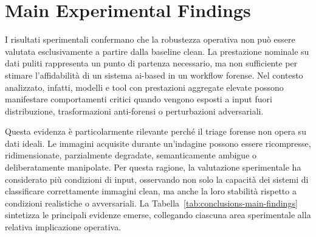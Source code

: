 \section{Main Experimental Findings}
\label{sec:conclusions-findings}

I risultati sperimentali confermano che la robustezza operativa non può essere
valutata esclusivamente a partire dalla baseline clean. La prestazione nominale
su dati puliti rappresenta un punto di partenza necessario, ma non sufficiente
per stimare l'affidabilità di un sistema \gls{ai}-based in un workflow forense.
Nel contesto analizzato, infatti, modelli e tool con prestazioni aggregate elevate
possono manifestare comportamenti critici quando vengono esposti a input fuori
distribuzione, trasformazioni anti-forensi o perturbazioni adversariali.

Questa evidenza è particolarmente rilevante perché il triage forense non opera
su dati ideali. Le immagini acquisite durante un'indagine possono essere
ricompresse, ridimensionate, parzialmente degradate, semanticamente ambigue o
deliberatamente manipolate. Per questa ragione, la valutazione sperimentale ha
considerato più condizioni di input, osservando non solo la capacità dei sistemi
di classificare correttamente immagini clean, ma anche la loro stabilità rispetto
a condizioni realistiche o avversariali. La
Tabella~\ref{tab:conclusions-main-findings} sintetizza le principali evidenze
emerse, collegando ciascuna area sperimentale alla relativa implicazione
operativa.

